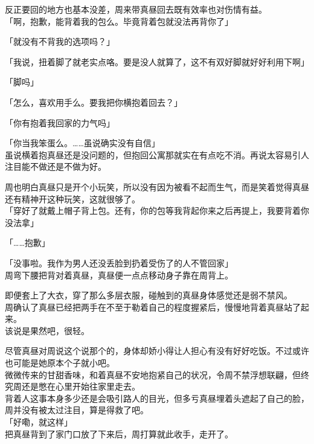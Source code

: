 反正要回的地方也基本没差，周来带真昼回去既有效率也对伤情有益。\\

「啊，抱歉，能背着我的包么。毕竟背着包就没法再背你了」

「就没有不背我的选项吗？」

「我说，扭着脚了就老实点咯。要是没人就算了，这不有双好脚就好好利用下啊」

「脚吗」

「怎么，喜欢用手么。要我把你横抱着回去？」

「你有抱着我回家的力气吗」

「你当我笨蛋么。……虽说确实没有自信」\\

虽说横着抱真昼还是没问题的，但抱回公寓那就实在有点吃不消。再说太容易引人注目能不做还是不做为好。

周也明白真昼只是开个小玩笑，所以没有因为被看不起而生气，而是笑着觉得真昼还有精神开这种玩笑，这就很够了。\\

「穿好了就戴上帽子背上包。还有，你的包等我背起你来之后再提上，我要背着你没法拿」

「……抱歉」

「没事啦。我作为男人还没丢脸到扔着受伤了的人不管回家」\\

周弯下腰把背对着真昼，真昼便一点点移动身子靠在周背上。

即便套上了大衣，穿了那么多层衣服，碰触到的真昼身体感觉还是弱不禁风。\\

周确认了真昼已经把两手在不至于勒着自己的程度握紧后，慢慢地背着真昼站了起来。\\

该说是果然吧，很轻。

尽管真昼对周说这个说那个的，身体却娇小得让人担心有没有好好吃饭。不过或许也可能是她原本个子就小吧。\\

微微传来的甘甜香味，和着真昼不安地抱紧自己的状况，令周不禁浮想联翩，但终究周还是憋在心里开始往家里走去。\\

背着人这事本身多少还是会吸引路人的目光，但多亏真昼埋着头遮起了自己的脸，周并没有被太过注目，算是得救了吧。\\

「好嘞，就这样」\\

把真昼背到了家门口放了下来后，周打算就此收手，走开了。

